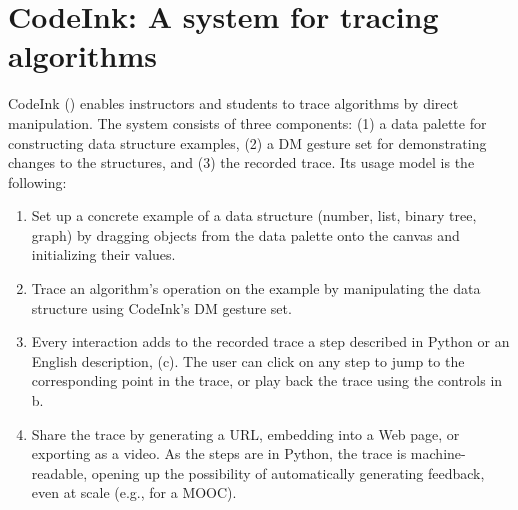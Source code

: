 

\section{CodeInk: A system for tracing algorithms}
CodeInk () enables
instructors and
students to trace algorithms by direct manipulation. The system consists of
three components: (1) a data palette for constructing data
structure examples, (2) a DM gesture set for demonstrating changes to the 
structures, and (3) the recorded trace.
Its usage model is the following:

\begin{enumerate}\itemsep0pt

\item Set up a concrete example of a data structure (number, list, binary tree,
graph) by dragging objects from the data palette onto the canvas and
initializing their values.

\item  Trace an algorithm's operation on the example by manipulating the data structure using CodeInk's DM gesture set.


\item Every interaction adds to the recorded trace a step described in 
Python or an English description, (c). The user can click on any step to
jump to the corresponding point in the trace, or play back the trace using the
controls in b.

\item Share the trace by generating a URL, embedding into a Web page, or
exporting as a video. As the steps are in Python, the trace is machine-readable, opening up the possibility of automatically generating feedback, even at scale (e.g., for a MOOC).

\end{enumerate}

